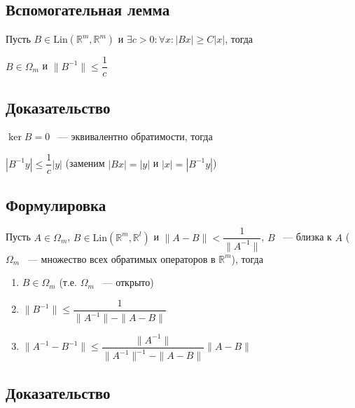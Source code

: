 \documentclass{article}
\begin{document}
        \subsection{Вспомогательная лемма}
        
            Пусть $B \in \mathrm{Lin}(\mathbb{R}^m, \mathbb{R}^m)$ и $\exists c > 0 : \forall x : |Bx| \geq C|x|$, тогда
                    
            $B \in \Omega_m$ и $\| B^{-1} \| \leq \dfrac{1}{c}$
                    
        \subsection{Доказательство}
        
            $\ker{B} = 0$ ~--- эквивалентно обратимости, тогда
            
            $|B^{-1}y| \leq \dfrac{1}{c} |y|$ (заменим $|Bx| = |y|$ и $|x| = |B^{-1}y|$)
            
        \subsection{Формулировка}
        
            Пусть $A \in \Omega_m$, $B \in \mathrm{Lin}(\mathbb{R}^m, \mathbb{R}^l)$ и $\| A - B \| < \dfrac{1}{\| A^{-1} \|}$, $B$ ~--- близка к $A$ ($\Omega_m$ ~--- множество всех обратимых операторов в $\mathbb{R}^m$), тогда
            
            \begin{enumerate}
            
                \item $B \in \Omega_m$ (т.е. $\Omega_m$ ~--- открыто)
                
                \item $\| B^{-1} \| \leq \dfrac{1}{\| A^{-1} \| - \| A - B \|}$
                
                \item $\| A^{-1} - B^{-1} \| \leq \dfrac{\| A^{-1} \|}{\| A^{-1} \|^{-1} - \| A - B \|} \| A - B \|$
                
            \end{enumerate}
            
        \subsection{Доказательство}
        
\end{document}
